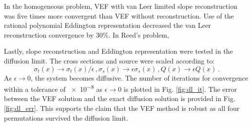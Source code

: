In the homogeneous problem, VEF with van Leer limited slope reconstruction was five times more convergent than VEF without reconstruction. Use of the rational polynomial Eddington representation decreased the van Leer reconstruction convergence by 30\%. In Reed's problem, 

Lastly, slope reconstruction and Eddington representation were tested in the diffusion limit. The cross sections and source were scaled according to: 
	\begin{subequations} \label{res:scaling}
		\begin{equation} 
			\sigma_t(x) \rightarrow \sigma_t(x)/\epsilon \,, 
		\end{equation}
		\begin{equation}
			\sigma_s(x) \rightarrow \epsilon \sigma_s(x) \,,
		\end{equation}
		\begin{equation}
			Q(x) \rightarrow \epsilon Q(x) \,. 
		\end{equation}
	\end{subequations}
As $\epsilon \rightarrow 0$, the system becomes diffusive. The number of iterations for convergence within a tolerance of \num{e-8} as $\epsilon \rightarrow 0$ is plotted in Fig. \ref{fig:dl_it}. The error between the VEF solution and the exact diffusion solution is provided in Fig. \ref{fig:dl_err}. This supports the claim that the VEF method is robust as all four permutations survived the diffusion limit. 
	
